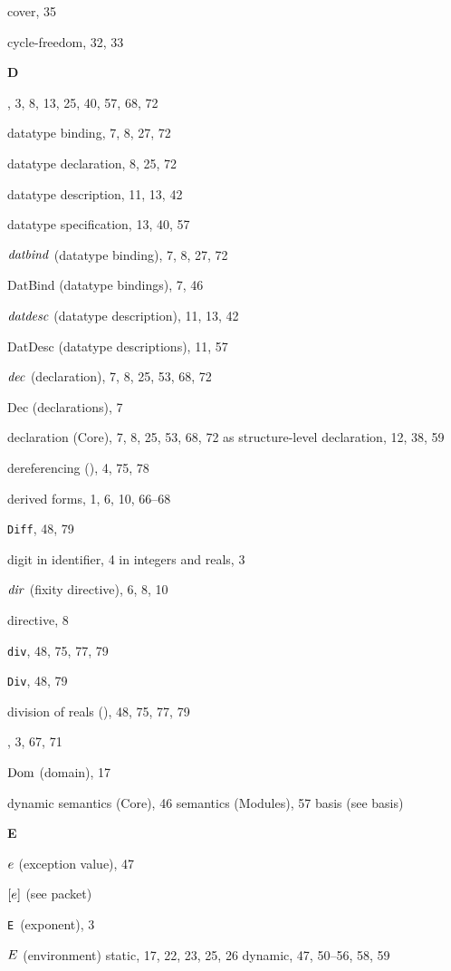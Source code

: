 \begin{theindex}
\item cover, 35
\item cycle-freedom, 32, 33
\indexspace
\parbox{65mm}{\hfil{\large\bf D}\hfil}
\indexspace
\item \DATATYPE, 3, 8, 13, 25, 40, 57, 68, 72
\item datatype binding, 7, 8, 27, 72
\item datatype declaration, 8, 25, 72
\item datatype description, 11, 13, 42
\item datatype specification, 13, 40, 57
\item ${\it datbind}$ (datatype binding), 7, 8, 27, 72
\item DatBind (datatype bindings), 7, 46
\item ${\it datdesc}$ (datatype description), 11, 13, 42
\item DatDesc (datatype descriptions), 11, 57
\item ${\it dec}$ (declaration), 7, 8, 25, 53, 68, 72
\item Dec (declarations), 7
\item declaration (Core), 7, 8, 25, 53, 68, 72
\subitem as structure-level declaration, 12, 38, 59
\item dereferencing (\ml{!}), 4, 75, 78
\item derived forms, 1, 6, 10, 66--68
\item {\tt Diff}, 48, 79
\item digit 
\subitem in identifier, 4
\subitem in integers and reals, 3
\item ${\it dir}$ (fixity directive), 6, 8, 10
\item directive, 8
\item {\tt div}, 48, 75, 77, 79
\item {\tt Div}, 48, 79
\item division of reals (\ml{/}), 48, 75, 77, 79
\item \DO, 3, 67, 71
\item $\mathop{\rm Dom}\nolimits$ (domain), 17
\item dynamic 
\subitem semantics (Core), 46
\subitem semantics (Modules), 57
\subitem basis (see basis) 
\indexspace
\parbox{65mm}{\hfil{\large\bf E}\hfil}
\indexspace
\item $e$ (exception value), 47
\item $[e]$ (see packet) 
\item \verb+E+\ (exponent), 3
\item $E$ (environment) 
\subitem static, 17, 22, 23, 25, 26
\subitem dynamic, 47, 50--56, 58, 59

\end{theindex}
